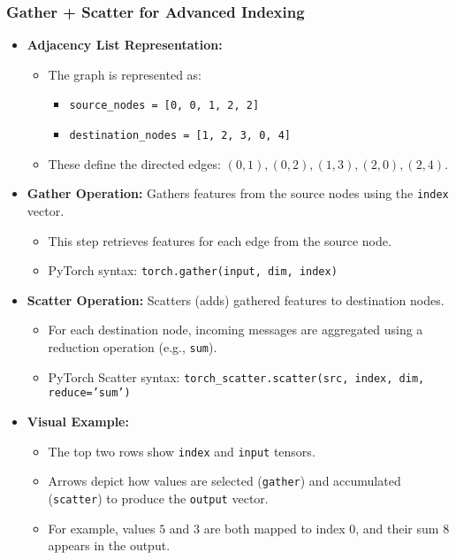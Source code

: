 \begin{notes}
\end{notes}

\subsubsection{Gather + Scatter for Advanced Indexing}
\begin{notes}
    \begin{itemize}    
        \item \textbf{Adjacency List Representation:}
        \begin{itemize}
            \item The graph is represented as:
            \begin{itemize}
                \item \texttt{source\_nodes = [0, 0, 1, 2, 2]}
                \item \texttt{destination\_nodes = [1, 2, 3, 0, 4]}
            \end{itemize}
            \item These define the directed edges: $(0,1), (0,2), (1,3), (2,0), (2,4)$.
        \end{itemize}
        \item \textbf{Gather Operation:} Gathers features from the source nodes using the \texttt{index} vector.
        \begin{itemize}
            \item This step retrieves features for each edge from the source node.
            \item PyTorch syntax: \texttt{torch.gather(input, dim, index)}
        \end{itemize}
        \item \textbf{Scatter Operation:} Scatters (adds) gathered features to destination nodes.
        \begin{itemize}
            \item For each destination node, incoming messages are aggregated using a reduction operation (e.g., \texttt{sum}).
            \item PyTorch Scatter syntax: \texttt{torch\_scatter.scatter(src, index, dim, reduce='sum')}
        \end{itemize}
        \item \textbf{Visual Example:}
        \begin{itemize}
            \item The top two rows show \texttt{index} and \texttt{input} tensors.
            \item Arrows depict how values are selected (\texttt{gather}) and accumulated (\texttt{scatter}) to produce the \texttt{output} vector.
            \item For example, values $5$ and $3$ are both mapped to index $0$, and their sum $8$ appears in the output.
        \end{itemize}
    \end{itemize}    
\end{notes}
